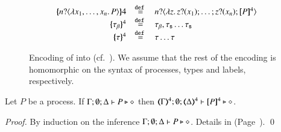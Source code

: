 \begin{figure}[t]
\[\begin{array}{rcl}
			\\
			\mapa{\bactinp{n}{\abs{x_1, \dots, x_n}{P}}}{4} &\defeq& \bactinp{n}{\abs{z}{\binp{z}{x_1} \dots; \binp{z}{x_n} \pmap{P}{4}}}
			\\
			\mapa{\btau}^{4} &\defeq& \btau, \stau \dots \stau
			\\
			\mapa{\tau}^{4} &\defeq& \tau \dots \tau
		\end{array}
	\]
%
	\caption{Encoding of \pHOp into \HOp (cf.~).
	We assume that the rest of the encoding is homomorphic on the syntax of
	processes, types and labels, respectively. \label{fig:enc:pHOp_to_HOp}}
\end{figure}

\begin{proposition}\rm
	\label{prop:typepres_pHOp_to_HOp}
	Let $P$ be a \pHOp process.
	If $\Gamma; \emptyset; \Delta \vdash P \triangleright \diamond$ then 
	$\tmap{\Gamma}{4}; \emptyset; \tmap{\Delta}{4} \proves \pmap{P}{4} \hastype \Proc$. 
\end{proposition}

\begin{proof}
	By induction on the inference $\Gamma; \emptyset; \Delta \vdash P \triangleright \diamond$.
	Details in  (Page~\pageref{app:prop:typepres_pHOp_to_HOp}).
	\qed
\end{proof}


